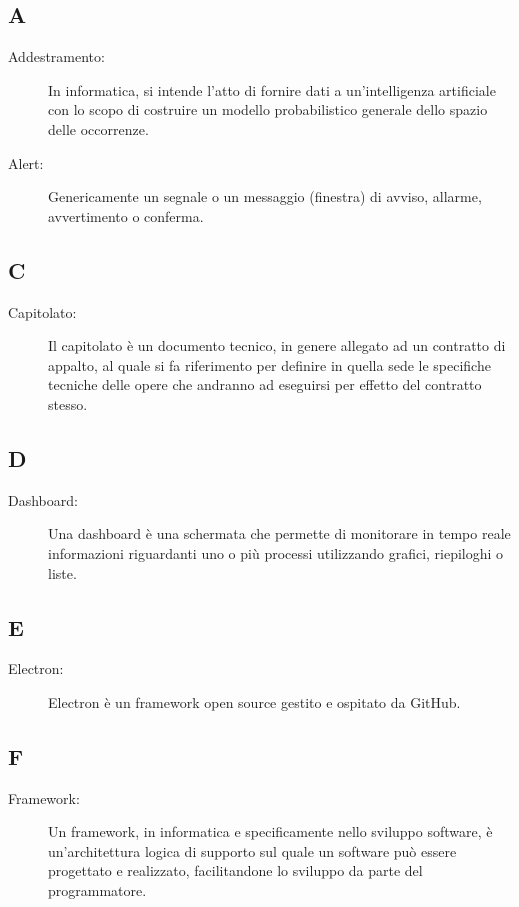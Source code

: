 \documentclass[../manuale-utente.tex]{subfiles}
\begin{document}
\subsection*{A}
\begin{description}
    \item[Addestramento:] In informatica, si intende l'atto di fornire dati a un'intelligenza artificiale con lo scopo di costruire un modello probabilistico generale dello spazio delle occorrenze.
    \item[Alert:] Genericamente un segnale o un messaggio (finestra) di avviso, allarme, avvertimento o conferma.
\end{description}

\subsection*{C}
\begin{description}
  \item[Capitolato:] Il capitolato è un documento tecnico, in genere allegato ad un contratto di appalto, al quale si fa riferimento per definire in quella sede le specifiche tecniche delle opere che andranno ad eseguirsi per effetto del contratto stesso.
\end{description}

\subsection*{D}
\begin{description}
  \item[Dashboard:] Una dashboard è una schermata che permette di monitorare in tempo reale informazioni riguardanti uno o più processi utilizzando grafici, riepiloghi o liste.
\end{description}

\subsection*{E}
\begin{description}
  \item[Electron:] Electron è un framework open source gestito e ospitato da GitHub.
\end{description}

\subsection*{F}
\begin{description}
  \item[Framework:] Un framework, in informatica e specificamente nello sviluppo software, è un'architettura logica di supporto sul quale un software può essere progettato e realizzato, facilitandone lo sviluppo da parte del programmatore.
\end{description}
\end{document}
